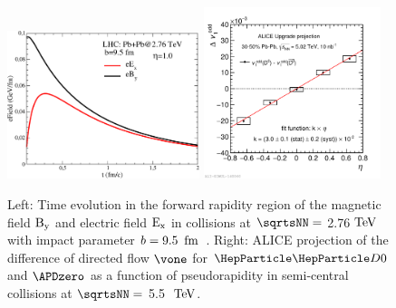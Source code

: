 \begin{figure}
\centering
\includegraphics[width=0.50\textwidth]{hf/figures/EMfield_evolution.pdf}
\includegraphics[width=0.46\textwidth]{hf/figures/2017-Oct-26-ALiceProjDeltav1Dzero.pdf}
\caption{Left: Time evolution in the forward rapidity region of the magnetic field $\rm B_{y}$ and electric field $\rm E_{x}$ in \PbPb collisions at $\sqrtsNN=$ 2.76$~\text{TeV}$ with impact parameter $b=9.5\,~\text{fm}$~\cite{Das:2016cwd}. Right: ALICE projection of the difference of directed flow $\vone$ for $\PDz$ and $\APDzero$ as a function of pseudorapidity in semi-central \PbPb collisions at $\sqrtsNN=$ 5.5 $~\text{TeV}$.}
\label{fig:v1}
\end {figure}






